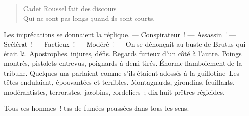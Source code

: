 \documentclass[french,twoside]{book} %
\def\mednobreak{\ifdim\lastskip<\medskipamount
  \removelastskip\nopagebreak\medskip\fi}
\newcommand{\labelblock}[1]{\medbreak{\noindent\color{rubric}\bfseries #1}\par\mednobreak}
\begin{document}
\begin{verse}
Cadet Roussel fait des discours\\
Qui ne sont pas longs quand ils sont courts.\\
\end{verse}

\noindent Les imprécations se donnaient la réplique. — Conspirateur ! — Assassin ! — Scélérat ! — Factieux ! — Modéré ! — On se dénonçait au buste de Brutus qui était là. Apostrophes, injures, défis. Regards furieux d’un côté à l’autre. Poings montrés, pistolets entrevus, poignards à demi tirés. Énorme flamboiement de la tribune. Quelques-uns parlaient comme s’ils étaient adossés à la guillotine. Les têtes ondulaient, épouvantées et terribles. Montagnards, girondins, feuillants, modérantistes, terroristes, jacobins, cordeliers ; dix-huit prêtres régicides.\par
Tous ces hommes ! tas de fumées poussées dans tous les sens.\par
 
\labelblock{xi}
\end{document}

